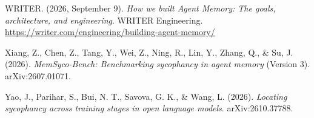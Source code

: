 WRITER. (2026, September 9). \emph{How we built Agent Memory: The goals, architecture, and engineering}. WRITER Engineering. \url{https://writer.com/engineering/building-agent-memory/}

Xiang, Z., Chen, Z., Tang, Y., Wei, Z., Ning, R., Lin, Y., Zhang, Q., \& Su, J. (2026). \emph{MemSyco-Bench: Benchmarking sycophancy in agent memory} (Version 3). arXiv:2607.01071.

Yao, J., Parihar, S., Bui, N. T., Savova, G. K., \& Wang, L. (2026). \emph{Locating sycophancy across training stages in open language models}. arXiv:2610.37788.

\par\endgroup
